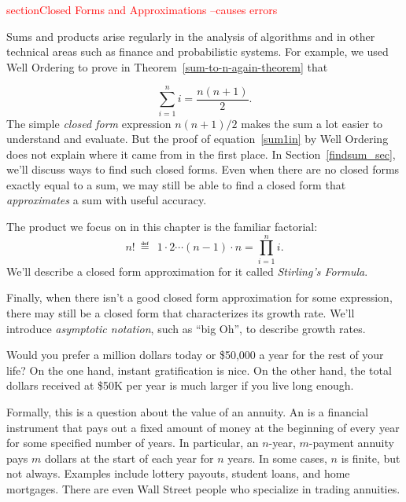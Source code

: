 \label{asymptotics_chap}

\begin{editingnotes}

\textcolor{red}{section{Closed Forms and Approximations} --causes errors}

Sums and products arise regularly in the analysis of algorithms and in
other technical areas such as finance and probabilistic systems.  For
example, we used Well Ordering to prove in
Theorem~\ref{sum-to-n-again-theorem} that

\begin{equation}\label{sum1in}
\sum_{i=1}^n i = \frac{n(n+1)}{2}.
\end{equation}
The simple \emph{closed form} expression $n(n+1)/2$ makes the sum a
lot easier to understand and evaluate.  But the proof of
equation~\eqref{sum1in} by Well Ordering does not explain where it
came from in the first place.  In Section~\ref{findsum_sec}, we'll
discuss ways to find such closed forms.  Even when there are no closed
forms exactly equal to a sum, we may still be able to find a closed
form that \emph{approximates} a sum with useful accuracy.


The product we focus on in this chapter is the familiar factorial:
\[
n!\ \eqdef\ \ 1 \cdot 2 \cdots  (n-1) \cdot n  = \prod_{i=1}^n i.
\]
We'll describe a closed form approximation for it called \emph{Stirling's
Formula}.

Finally, when there isn't a good closed form approximation for some
expression, there may still be a closed form that characterizes its growth
rate.  We'll introduce \emph{asymptotic notation}, such as ``big Oh'', to
describe growth rates.
\end{editingnotes}


\label{annuity_sec}

Would you prefer a million dollars today or \$50,000 a year for the
rest of your life?  On the one hand, instant gratification is nice.
On the other hand, the total dollars received at \$50K per year is
much larger if you live long enough.

Formally, this is a question about the value of an annuity.  An
 is a financial instrument that pays out a fixed amount of
money at the beginning of every year for some specified number of years.
In particular, an $n$-year, $m$-payment annuity pays $m$ dollars at the
start of each year for $n$ years.  In some cases, $n$ is finite, but not
always.  Examples include lottery payouts, student loans, and home
mortgages.  There are even Wall Street people who specialize in trading
annuities.

